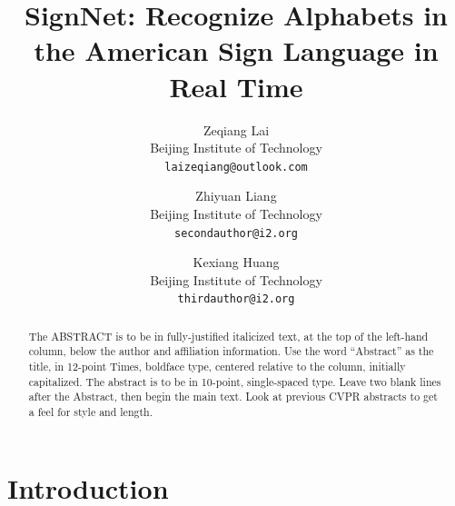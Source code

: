 \documentclass[10pt,twocolumn,letterpaper]{article}
\begin{document}
\title{SignNet: Recognize Alphabets in the American Sign Language in Real Time}

\author{
Zeqiang Lai\\
Beijing Institute of Technology\\
{\tt\small laizeqiang@outlook.com}
\and
Zhiyuan Liang\\
Beijing Institute of Technology\\
{\tt\small secondauthor@i2.org}
\and
Kexiang Huang\\
Beijing Institute of Technology\\
{\tt\small thirdauthor@i2.org}
}

\maketitle

\begin{abstract}
   The ABSTRACT is to be in fully-justified italicized text, at the top
   of the left-hand column, below the author and affiliation
   information. Use the word ``Abstract'' as the title, in 12-point
   Times, boldface type, centered relative to the column, initially
   capitalized. The abstract is to be in 10-point, single-spaced type.
   Leave two blank lines after the Abstract, then begin the main text.
   Look at previous CVPR abstracts to get a feel for style and length.
\end{abstract}

\section{Introduction}

\blindtext
\end{document}
